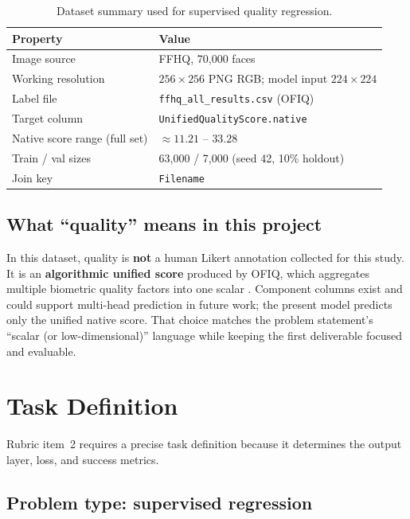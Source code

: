 \documentclass[12pt, letterpaper, titlepage]{article}
\newcommand{\TableHere}[1][0.34\textheight]{%
  \Needspace{#1}%
  \begin{table}[H]%
}
\begin{document}
\TableHere[10\baselineskip]
\caption{Dataset summary used for supervised quality regression.}
\label{tab:dataset}
\centering
\footnotesize
\begin{tabularx}{\textwidth}{|L{0.34\textwidth}|Y|}
\hline
\textbf{Property} & \textbf{Value} \\
\hline
Image source & FFHQ, 70{,}000 faces \citep{karras2019stylegan} \\
\hline
Working resolution & $256\times 256$ PNG RGB; model input $224\times 224$ \\
\hline
Label file & \texttt{ffhq\_all\_results.csv} (OFIQ) \\
\hline
Target column & \texttt{UnifiedQualityScore.native} \\
\hline
Native score range (full set) & $\approx 11.21$ -- $33.28$ \\
\hline
Train / val sizes & 63{,}000 / 7{,}000 (seed 42, 10\% holdout) \\
\hline
Join key & \texttt{Filename} \\
\hline
\end{tabularx}
\end{table}

\subsection{What ``quality'' means in this project}

In this dataset, quality is \textbf{not} a human Likert annotation collected for this study. It is an \textbf{algorithmic unified score} produced by OFIQ, which aggregates multiple biometric quality factors into one scalar \citep{bsi2024ofiq,iso29794_5_2025}. Component columns exist and could support multi-head prediction in future work; the present model predicts only the unified native score. That choice matches the problem statement's ``scalar (or low-dimensional)'' language while keeping the first deliverable focused and evaluable.

\FloatBarrier
\section{Task Definition}
\label{sec:task}

Rubric item~2 requires a precise task definition because it determines the output layer, loss, and success metrics.

\subsection{Problem type: supervised regression}
\end{document}
